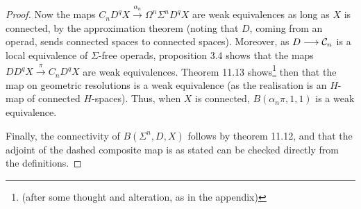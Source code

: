 \documentclass[11pt]{article}
\begin{document}
\begin{chapter13-15}
\begin{proof}
Now the maps $C_nD^{q}X\overset{\alpha_n}{\to} \Omega^n\Sigma^nD^qX$ are weak equivalences as long as $X$ is connected, by the approximation theorem (noting that $D$, coming from an operad, sends connected spaces to connected spaces). Moreover, as $D\longrightarrow\mathcal{C}_n$ is a local equivalence of $\Sigma$-free operads, proposition 3.4 shows that the maps $DD^{q}X\overset{\pi}{\to}C_nD^{q}X$ are weak equivalences. Theorem 11.13 shows\footnote{(after some thought and alteration, as in the appendix)} then that the map on geometric resolutions is a weak equivalence (as the realisation is an $H$-map of connected $H$-spaces). Thus, when $X$ is connected, $B(\alpha_n\pi,1,1)$ is a weak equivalence.

Finally, the connectivity of $B(\Sigma^n,D,X)$ follows by theorem 11.12, and that the adjoint of the dashed composite map is as stated can be checked directly from the definitions.
\end{proof}

\end{chapter13-15}
\end{document}
